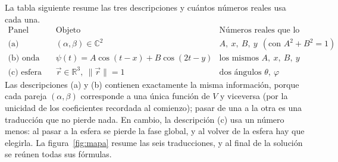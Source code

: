 \medskip
La tabla siguiente resume las tres descripciones y cuántos números reales usa cada una.
\[
\renewcommand{\arraystretch}{1.35}
\begin{array}{l|l|l}
\text{Panel} & \text{Objeto} & \text{Números reales que lo determinan}\\ \hline
\text{(a) coeficientes} & (\alpha,\beta)\in\mathbb C^2 & A,\ x,\ B,\ y\ \ (\text{con } A^2+B^2=1)\\
\text{(b) onda} & \psi(t)=A\cos(t-x)+B\cos(2t-y) & \text{los mismos } A,\ x,\ B,\ y\\
\text{(c) esfera} & \vec r\in\mathbb R^3,\ \lVert\vec r\rVert=1 & \text{dos ángulos } \theta,\ \varphi
\end{array}
\]
Las descripciones (a) y (b) contienen exactamente la misma información, porque cada pareja
$(\alpha,\beta)$ corresponde a una única función de $V$ y viceversa (por la unicidad de los
coeficientes recordada al comienzo); pasar de una a la otra es una traducción que no pierde
nada. En cambio, la descripción (c) usa un número menos: al pasar a la esfera se pierde la fase
global, y al volver de la esfera hay que elegirla. La figura~\ref{fig:mapa} resume las seis
traducciones, y al final de la solución se reúnen todas sus fórmulas.

